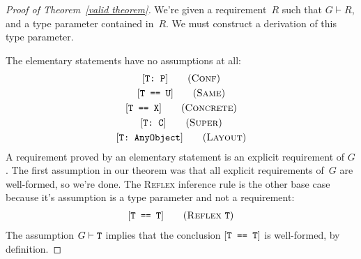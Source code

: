 \documentclass[../generics]{subfiles}
\begin{document}
\begin{proof}[Proof of Theorem~\ref*{valid theorem}]
We're given a requirement~$R$ such that $G\vdash R$, and a type parameter contained in~$R$. We must construct a derivation of this type parameter.

\BaseCase The elementary statements have no assumptions at all:
\begin{gather*}
\ConfStepDef\\
\SameStepDef\\
\ConcreteStepDef\\
\SuperStepDef\\
\LayoutStepDef
\end{gather*}
A requirement proved by an elementary statement is an explicit requirement of $G$. The first assumption in our theorem was that all explicit requirements of~$G$ are well-formed, so we're done. The \textsc{Reflex} inference rule is the other base case because it's assumption is a type parameter and not a requirement:
\begin{gather*}
\ReflexStepDef
\end{gather*}
The assumption $G\vdash\texttt{T}$ implies that the conclusion $[\texttt{T == T}]$ is well-formed, by definition.


\end{proof}
\end{document}
